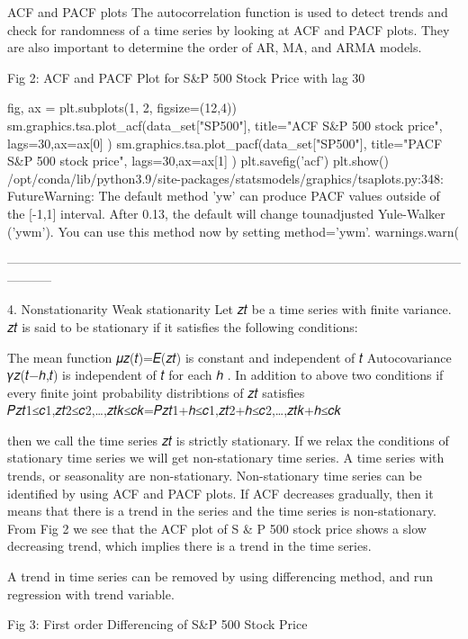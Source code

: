 ACF and PACF plots
The autocorrelation function is used to detect trends and check for randomness of a time series by looking at ACF and PACF plots. They are also important to determine the order of AR, MA, and ARMA models.

Fig 2: ACF and PACF Plot for S&P 500 Stock Price with lag 30

fig, ax = plt.subplots(1, 2, figsize=(12,4))
sm.graphics.tsa.plot_acf(data_set["SP500"], title="ACF S&P 500 stock price", lags=30,ax=ax[0] )
sm.graphics.tsa.plot_pacf(data_set["SP500"], title="PACF S&P 500 stock price", lags=30,ax=ax[1] )
plt.savefig('acf')
plt.show()
/opt/conda/lib/python3.9/site-packages/statsmodels/graphics/tsaplots.py:348: FutureWarning: The default method 'yw' can produce PACF values outside of the [-1,1] interval. After 0.13, the default will change tounadjusted Yule-Walker ('ywm'). You can use this method now by setting method='ywm'.
  warnings.warn(






-----------------------------------------------------------------------------------------------------------------------



4. Nonstationarity
Weak stationarity
Let  {𝑧𝑡}  be a time series with finite variance.  {𝑧𝑡}  is said to be stationary if it satisfies the following conditions:

The mean function  𝜇𝑧(𝑡)=𝐸(𝑧𝑡)  is constant and independent of  𝑡 
Autocovariance  𝛾𝑧(𝑡−ℎ,𝑡)  is independent of  𝑡  for each  ℎ .
In addition to above two conditions if every finite joint probability distribtions of  {𝑧𝑡}  satisfies
𝑃{𝑧𝑡1≤𝑐1,𝑧𝑡2≤𝑐2,…,𝑧𝑡𝑘≤𝑐𝑘}=𝑃{𝑧𝑡1+ℎ≤𝑐1,𝑧𝑡2+ℎ≤𝑐2,…,𝑧𝑡𝑘+ℎ≤𝑐𝑘}
 
then we call the time series  {𝑧𝑡}  is strictly stationary. If we relax the conditions of stationary time series we will get non-stationary time series.
A time series with trends, or seasonality are non-stationary.
Non-stationary time series can be identified by using ACF and PACF plots. If ACF decreases gradually, then it means that there is a trend in the series and the time series is non-stationary. From Fig 2 we see that the ACF plot of S & P 500 stock price shows a slow decreasing trend, which implies there is a trend in the time series.

A trend in time series can be removed by using differencing method, and run regression with trend variable.

Fig 3: First order Differencing of S&P 500 Stock Price

